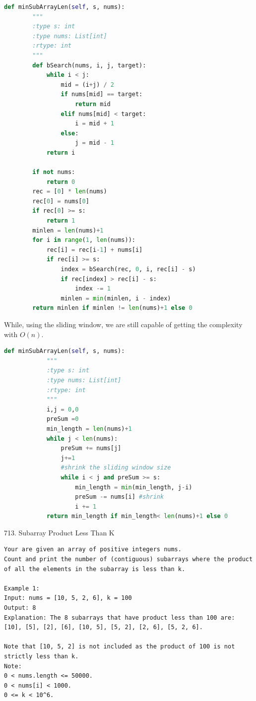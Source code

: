 \documentclass[../specific-algorithms.tex]{subfiles}
\begin{document}
\begin{lstlisting}[language = Python]
    def minSubArrayLen(self, s, nums):
        """
        :type s: int
        :type nums: List[int]
        :rtype: int
        """
        def bSearch(nums, i, j, target):
            while i < j:
                mid = (i+j) / 2
                if nums[mid] == target:
                    return mid
                elif nums[mid] < target:
                    i = mid + 1
                else:
                    j = mid - 1
            return i   
        
        if not nums:
            return 0
        rec = [0] * len(nums)
        rec[0] = nums[0]
        if rec[0] >= s:
            return 1
        minlen = len(nums)+1
        for i in range(1, len(nums)):
            rec[i] = rec[i-1] + nums[i]
            if rec[i] >= s:
                index = bSearch(rec, 0, i, rec[i] - s)
                if rec[index] > rec[i] - s:
                    index -= 1
                minlen = min(minlen, i - index)
        return minlen if minlen != len(nums)+1 else 0
\end{lstlisting}
While, using the sliding window, we are still capable of getting the complexity with $O(n)$. 
\begin{lstlisting}[language = Python]
    def minSubArrayLen(self, s, nums):
            """
            :type s: int
            :type nums: List[int]
            :rtype: int
            """
            i,j = 0,0
            preSum =0
            min_length = len(nums)+1
            while j < len(nums):          
                preSum += nums[j]
                j+=1
                #shrink the sliding window size
                while i < j and preSum >= s:
                    min_length = min(min_length, j-i)
                    preSum -= nums[i] #shrink
                    i += 1
            return min_length if min_length< len(nums)+1 else 0
\end{lstlisting}

713. Subarray Product Less Than K

\begin{lstlisting}
Your are given an array of positive integers nums.
Count and print the number of (contiguous) subarrays where the product of all the elements in the subarray is less than k.

Example 1:
Input: nums = [10, 5, 2, 6], k = 100
Output: 8
Explanation: The 8 subarrays that have product less than 100 are: [10], [5], [2], [6], [10, 5], [5, 2], [2, 6], [5, 2, 6].

Note that [10, 5, 2] is not included as the product of 100 is not strictly less than k.
Note:
0 < nums.length <= 50000.
0 < nums[i] < 1000.
0 <= k < 10^6.
\end{lstlisting}
\end{document}
